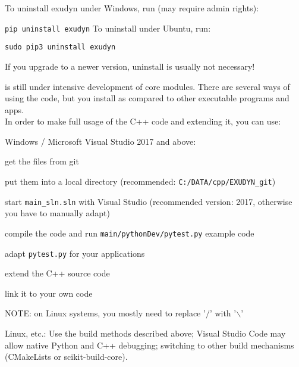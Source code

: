 
To uninstall exudyn under Windows, run (may require admin rights):
\bi
  \item[] \texttt{pip uninstall exudyn}
\ei
\noindent To uninstall under Ubuntu, run:
\bi
  \item[] \texttt{sudo pip3 uninstall exudyn}
\ei

If you upgrade to a newer version, uninstall is usually not necessary!
%

\codeName is still under intensive development of core modules.
There are several ways of using the code, but you  install \codeName as compared to other executable programs and apps.
\vspace{6pt}\\
In order to make full usage of the C++ code and extending it, you can use:
\bi
  \item Windows / Microsoft Visual Studio 2017 and above:
  \bi
    \item get the files from git
    \item put them into a local directory (recommended: \texttt{C:/DATA/cpp/EXUDYN\_git})
    \item start \texttt{main\_sln.sln} with Visual Studio (recommended version: 2017, otherwise you have to manually adapt)
    \item compile the code and run \texttt{main/pythonDev/pytest.py} example code
    \item adapt \texttt{pytest.py} for your applications
    \item extend the C++ source code
    \item link it to your own code
    \item NOTE: on Linux systems, you mostly need to replace '$/$' with '$\backslash$'
  \ei
  \item Linux, etc.: Use the build methods described above; Visual Studio Code may allow native Python and C++ debugging; switching to other build mechanisms (CMakeLists or scikit-build-core).
\ei
%
